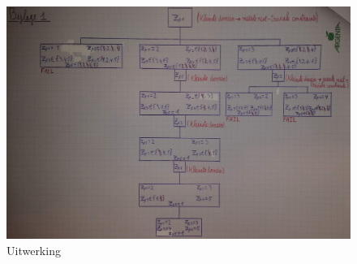 \documentclass{article}
\begin{document}
\newpage
\begin{figure}[H]
\caption{Uitwerking}
\label{uitwerking}
\centering
\includegraphics[scale=0.135, angle=90]{uitwerking.jpg}
\end{figure}
\end{document}
